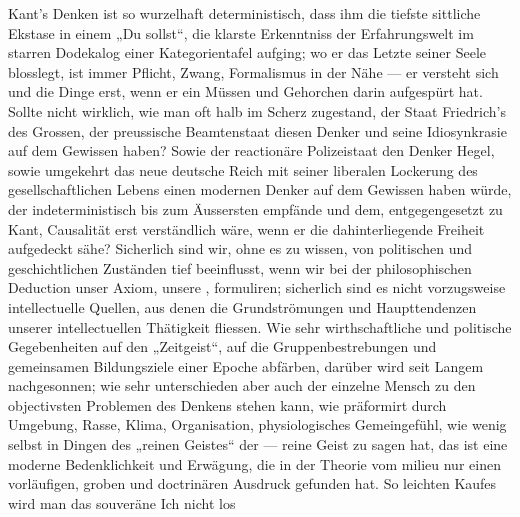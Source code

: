 Kant’s Denken ist so wurzelhaft deterministisch, dass ihm die tiefste sittliche Ekstase in einem „Du sollst“, die klarste Erkenntniss der Erfahrungswelt im starren Dodekalog einer Kategorientafel aufging; wo er das Letzte seiner Seele blosslegt, ist immer Pflicht, Zwang, Formalismus in der Nähe — er versteht sich und die Dinge erst, wenn er ein Müssen und Gehorchen darin aufgespürt hat. Sollte nicht wirklich, wie man oft halb im Scherz zugestand, der Staat Friedrich’s des Grossen, der preussische Beamtenstaat diesen Denker und seine Idiosynkrasie auf dem Gewissen haben? Sowie der reactionäre Polizeistaat den Denker Hegel, sowie umgekehrt das neue deutsche Reich mit seiner liberalen Lockerung des gesellschaftlichen Lebens einen modernen Denker auf dem Gewissen haben würde, der indeterministisch bis zum Äussersten empfände und dem, entgegengesetzt zu Kant, Causalität erst verständlich wäre, wenn er die dahinterliegende Freiheit aufgedeckt sähe? Sicherlich sind wir, ohne es zu wissen, von politischen und geschichtlichen Zuständen tief beeinflusst, wenn wir bei der philosophischen Deduction unser Axiom, unsere ,    formuliren; sicherlich sind es nicht vorzugsweise intellectuelle Quellen, aus denen die Grundströmungen und Haupttendenzen unserer intellectuellen Thätigkeit fliessen. Wie sehr wirthschaftliche und politische Gegebenheiten auf den „Zeitgeist“, auf die Gruppenbestrebungen und gemeinsamen Bildungsziele einer Epoche abfärben, darüber wird seit Langem nachgesonnen; wie sehr unterschieden aber auch der einzelne Mensch zu den objectivsten Problemen des Denkens stehen kann, wie präformirt durch Umgebung, Rasse, Klima, Organisation, physiologisches Gemeingefühl, wie wenig selbst in Dingen des „reinen Geistes“ der — reine Geist zu sagen hat, das ist eine moderne Bedenklichkeit und Erwägung, die in der Theorie vom milieu nur einen vorläufigen, groben und doctrinären Ausdruck gefunden hat. So leichten Kaufes wird man das souveräne Ich nicht los 
\par

